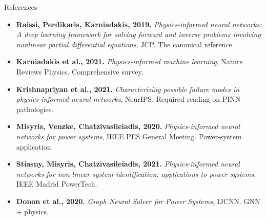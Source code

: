 \documentclass[aspectratio=169,10pt]{beamer}
\begin{document}
\begin{frame}{References}
\footnotesize
\begin{itemize}
  \item \textbf{Raissi, Perdikaris, Karniadakis, 2019.} \emph{Physics-informed neural networks: A deep learning framework for solving forward and inverse problems involving nonlinear partial differential equations}, JCP. The canonical reference.
  \item \textbf{Karniadakis et al., 2021.} \emph{Physics-informed machine learning}, Nature Reviews Physics. Comprehensive survey.
  \item \textbf{Krishnapriyan et al., 2021.} \emph{Characterizing possible failure modes in physics-informed neural networks}, NeurIPS. Required reading on PINN pathologies.
  \item \textbf{Misyris, Venzke, Chatzivasileiadis, 2020.} \emph{Physics-informed neural networks for power systems}, IEEE PES General Meeting. Power-system application.
  \item \textbf{Stiasny, Misyris, Chatzivasileiadis, 2021.} \emph{Physics-informed neural networks for non-linear system identification: applications to power systems}, IEEE Madrid PowerTech.
  \item \textbf{Donon et al., 2020.} \emph{Graph Neural Solver for Power Systems}, IJCNN. GNN + physics.
\end{itemize}
\end{frame}
\end{document}
